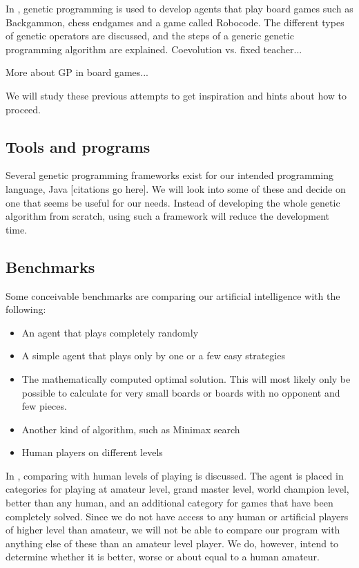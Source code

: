 \documentclass[times, 10pt,twocolumn]{article}
\begin{document}
In \cite{human-competitive_gp}, genetic programming is used to develop agents that play board games such as Backgammon, chess endgames and a game called Robocode. The different types of genetic operators are discussed, and the steps of a generic genetic programming algorithm are explained. Coevolution vs. fixed teacher...

More about GP in board games...

We will study these previous attempts to get inspiration and hints about how to proceed.

\subsection{Tools and programs}

Several genetic programming frameworks exist for our intended programming language, Java [citations go here]. We will look into some of these and decide on one that seems be useful for our needs. Instead of developing the whole genetic algorithm from scratch, using such a framework will reduce the development time.

\subsection{Benchmarks}

Some conceivable benchmarks are comparing our artificial intelligence with the following:
\begin{itemize}
	\item{An agent that plays completely randomly}
	\item{A simple agent that plays only by one or a few easy strategies}
	\item{The mathematically computed optimal solution. This will most likely only be possible to calculate for very small boards or boards with no opponent and few pieces.}
	\item{Another kind of algorithm, such as Minimax search}
	\item{Human players on different levels}
\end{itemize}

In \cite{games_solved}, comparing with human levels of playing is discussed.  The agent is placed in categories for playing at amateur level, grand master level, world champion level, better than any human, and an additional category for games that have been completely solved. Since we do not have access to any human or artificial players of higher level than amateur, we will not be able to compare our program with anything else of these than an amateur level player. We do, however, intend to determine whether it is better, worse or about equal to a human amateur.
\end{document}
